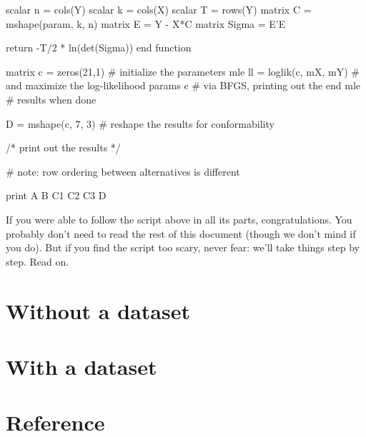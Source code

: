 \documentclass[oneside]{book}
\begin{document}
\begin{scode}
    scalar n = cols(Y)
    scalar k = cols(X)
    scalar T = rows(Y)
    matrix C = mshape(param, k, n)
    matrix E = Y - X*C
    matrix Sigma = E'E

    return -T/2 * ln(det(Sigma))
end function

matrix c = zeros(21,1)                  # initialize the parameters
mle ll = loglik(c, mX, mY)              # and maximize the log-likelihood
    params c                            # via BFGS, printing out the
end mle                                 # results when done

D = mshape(c, 7, 3)                     # reshape the results for conformability

/* print out the results */

# note: row ordering between alternatives is different 

print A B C1 C2 C3 D
\end{scode}

If you were able to follow the script above in all its parts,
congratulations. You probably don't need to read the rest of this
document (though we don't mind if you do). But if you find the script
too scary, never fear: we'll take things step by step. Read on.

\part{Without a dataset}
\label{part:hp-nodata}








\part{With a dataset}
\label{part:hp-data}




\part{Reference}
\label{part:hp-reference}





% 

% 
\end{document}
